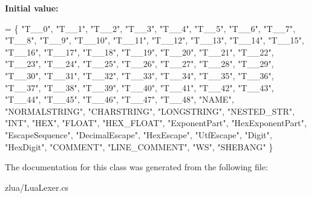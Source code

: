 {\bfseries Initial value\+:}
\begin{DoxyCode}
= \{
        \textcolor{stringliteral}{"T\_\_0"}, \textcolor{stringliteral}{"T\_\_1"}, \textcolor{stringliteral}{"T\_\_2"}, \textcolor{stringliteral}{"T\_\_3"}, \textcolor{stringliteral}{"T\_\_4"}, \textcolor{stringliteral}{"T\_\_5"}, \textcolor{stringliteral}{"T\_\_6"}, \textcolor{stringliteral}{"T\_\_7"}, \textcolor{stringliteral}{"T\_\_8"}, 
        \textcolor{stringliteral}{"T\_\_9"}, \textcolor{stringliteral}{"T\_\_10"}, \textcolor{stringliteral}{"T\_\_11"}, \textcolor{stringliteral}{"T\_\_12"}, \textcolor{stringliteral}{"T\_\_13"}, \textcolor{stringliteral}{"T\_\_14"}, \textcolor{stringliteral}{"T\_\_15"}, \textcolor{stringliteral}{"T\_\_16"}, 
        \textcolor{stringliteral}{"T\_\_17"}, \textcolor{stringliteral}{"T\_\_18"}, \textcolor{stringliteral}{"T\_\_19"}, \textcolor{stringliteral}{"T\_\_20"}, \textcolor{stringliteral}{"T\_\_21"}, \textcolor{stringliteral}{"T\_\_22"}, \textcolor{stringliteral}{"T\_\_23"}, \textcolor{stringliteral}{"T\_\_24"}, 
        \textcolor{stringliteral}{"T\_\_25"}, \textcolor{stringliteral}{"T\_\_26"}, \textcolor{stringliteral}{"T\_\_27"}, \textcolor{stringliteral}{"T\_\_28"}, \textcolor{stringliteral}{"T\_\_29"}, \textcolor{stringliteral}{"T\_\_30"}, \textcolor{stringliteral}{"T\_\_31"}, \textcolor{stringliteral}{"T\_\_32"}, 
        \textcolor{stringliteral}{"T\_\_33"}, \textcolor{stringliteral}{"T\_\_34"}, \textcolor{stringliteral}{"T\_\_35"}, \textcolor{stringliteral}{"T\_\_36"}, \textcolor{stringliteral}{"T\_\_37"}, \textcolor{stringliteral}{"T\_\_38"}, \textcolor{stringliteral}{"T\_\_39"}, \textcolor{stringliteral}{"T\_\_40"}, 
        \textcolor{stringliteral}{"T\_\_41"}, \textcolor{stringliteral}{"T\_\_42"}, \textcolor{stringliteral}{"T\_\_43"}, \textcolor{stringliteral}{"T\_\_44"}, \textcolor{stringliteral}{"T\_\_45"}, \textcolor{stringliteral}{"T\_\_46"}, \textcolor{stringliteral}{"T\_\_47"}, \textcolor{stringliteral}{"T\_\_48"}, 
        \textcolor{stringliteral}{"NAME"}, \textcolor{stringliteral}{"NORMALSTRING"}, \textcolor{stringliteral}{"CHARSTRING"}, \textcolor{stringliteral}{"LONGSTRING"}, \textcolor{stringliteral}{"NESTED\_STR"}, \textcolor{stringliteral}{"INT"}, 
        \textcolor{stringliteral}{"HEX"}, \textcolor{stringliteral}{"FLOAT"}, \textcolor{stringliteral}{"HEX\_FLOAT"}, \textcolor{stringliteral}{"ExponentPart"}, \textcolor{stringliteral}{"HexExponentPart"}, \textcolor{stringliteral}{"EscapeSequence"}, 
        \textcolor{stringliteral}{"DecimalEscape"}, \textcolor{stringliteral}{"HexEscape"}, \textcolor{stringliteral}{"UtfEscape"}, \textcolor{stringliteral}{"Digit"}, \textcolor{stringliteral}{"HexDigit"}, \textcolor{stringliteral}{"COMMENT"}, 
        \textcolor{stringliteral}{"LINE\_COMMENT"}, \textcolor{stringliteral}{"WS"}, \textcolor{stringliteral}{"SHEBANG"}
    \}
\end{DoxyCode}


The documentation for this class was generated from the following file\+:\begin{DoxyCompactItemize}
\item 
zlua/Lua\+Lexer.\+cs\end{DoxyCompactItemize}
